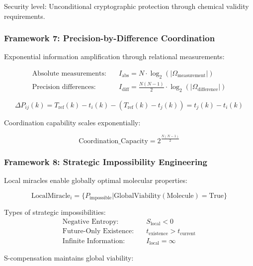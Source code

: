 \documentclass[11pt,a4paper]{article}
\begin{document}
Security level: Unconditional cryptographic protection through chemical validity requirements.

\subsubsection{Framework 7: Precision-by-Difference Coordination}

Exponential information amplification through relational measurements:

\begin{align}
\text{Absolute measurements:} \quad &I_{\text{abs}} = N \cdot \log_2(|\Omega_{\text{measurement}}|) \\
\text{Precision differences:} \quad &I_{\text{diff}} = \frac{N(N-1)}{2} \cdot \log_2(|\Omega_{\text{difference}}|)
\end{align}

\begin{equation}
\Delta P_{ij}(k) = T_{\text{ref}}(k) - t_i(k) - (T_{\text{ref}}(k) - t_j(k)) = t_j(k) - t_i(k)
\end{equation}

Coordination capability scales exponentially:

\begin{equation}
\text{Coordination\_Capacity} = 2^{\frac{N(N-1)}{2}}
\end{equation}

\subsubsection{Framework 8: Strategic Impossibility Engineering}

Local miracles enable globally optimal molecular properties:

\begin{equation}
\text{LocalMiracle}_i = \{P_{\text{impossible}} | \text{GlobalViability}(\text{Molecule}) = \text{True}\}
\end{equation}

Types of strategic impossibilities:
\begin{align}
\text{Negative Entropy:} \quad &S_{\text{local}} < 0 \\
\text{Future-Only Existence:} \quad &t_{\text{existence}} > t_{\text{current}} \\
\text{Infinite Information:} \quad &I_{\text{local}} = \infty
\end{align}

S-compensation maintains global viability:
\end{document}
